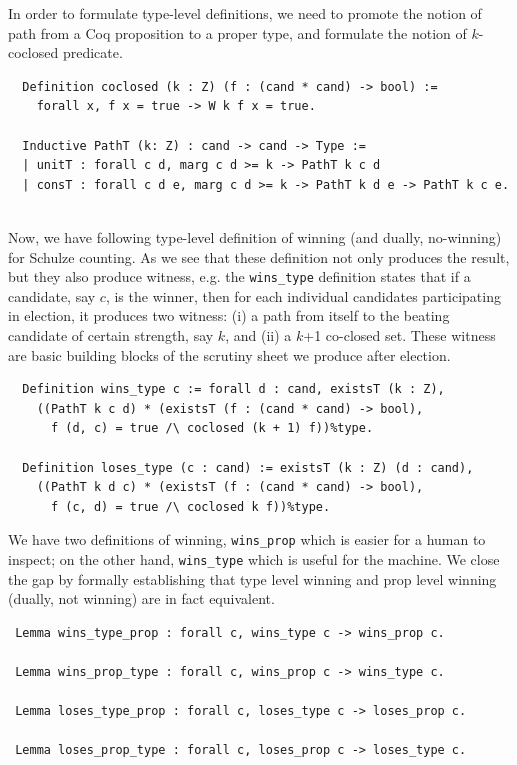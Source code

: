 \noindent
In order to formulate type-level definitions, we need to promote the
notion of path from a Coq proposition to a proper type, and
formulate the notion of $k$-coclosed predicate.

\begin{verbatim} 
  Definition coclosed (k : Z) (f : (cand * cand) -> bool) :=
    forall x, f x = true -> W k f x = true.

  Inductive PathT (k: Z) : cand -> cand -> Type :=
  | unitT : forall c d, marg c d >= k -> PathT k c d
  | consT : forall c d e, marg c d >= k -> PathT k d e -> PathT k c e.
 
\end{verbatim}


\noindent
Now, we have following type-level definition of winning (and dually, 
no-winning) for Schulze counting. As we see that these definition not only produces 
the result, but they also produce witness, e.g. the \texttt{wins\_type} definition 
states that if a candidate, say $c$, is the winner,  
then for each individual candidates participating in election, it produces two witness:
(i) a path from itself to the beating candidate of certain strength, say $k$, and 
(ii) a $k$+1 co-closed set.  These witness are basic building blocks of the 
scrutiny sheet we produce after election. 

\begin{verbatim}
  Definition wins_type c := forall d : cand, existsT (k : Z),
    ((PathT k c d) * (existsT (f : (cand * cand) -> bool),
      f (d, c) = true /\ coclosed (k + 1) f))%type.

  Definition loses_type (c : cand) := existsT (k : Z) (d : cand),
    ((PathT k d c) * (existsT (f : (cand * cand) -> bool),
      f (c, d) = true /\ coclosed k f))%type.
\end{verbatim}

\noindent
We have two definitions of winning, \texttt{wins\_prop} which is easier for a human to inspect; 
on the other hand, \texttt{wins\_type} which is useful for the machine. 
We close the gap by formally establishing that type level winning and prop level winning 
(dually, not winning) are in fact equivalent. 

\begin{verbatim}
 Lemma wins_type_prop : forall c, wins_type c -> wins_prop c.

 Lemma wins_prop_type : forall c, wins_prop c -> wins_type c.
 
 Lemma loses_type_prop : forall c, loses_type c -> loses_prop c.
 
 Lemma loses_prop_type : forall c, loses_prop c -> loses_type c.
\end{verbatim}

